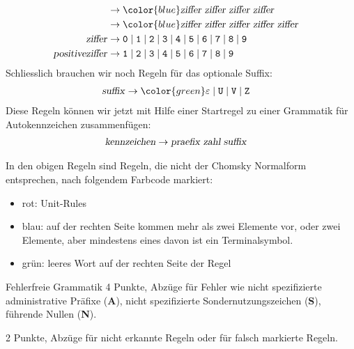 \begin{loesung}
\begin{teilaufgaben}
\begin{align*}
\\
&\rightarrow
{\color{blue}
\text{\textsl{ziffer}}\;
\text{\textsl{ziffer}}\;
\text{\textsl{ziffer}}\;
\text{\textsl{ziffer}}}
\\
&\rightarrow
{\color{blue}
\text{\textsl{ziffer}}\;
\text{\textsl{ziffer}}\;
\text{\textsl{ziffer}}\;
\text{\textsl{ziffer}}\;
\text{\textsl{ziffer}}}
\\
\text{\textsl{ziffer}}
&\rightarrow
{\tt 0}\;|\;
{\tt 1}\;|\;
{\tt 2}\;|\;
{\tt 3}\;|\;
{\tt 4}\;|\;
{\tt 5}\;|\;
{\tt 6}\;|\;
{\tt 7}\;|\;
{\tt 8}\;|\;
{\tt 9}
\\
\text{\textsl{positiveziffer}}
&\rightarrow
{\tt 1}\;|\;
{\tt 2}\;|\;
{\tt 3}\;|\;
{\tt 4}\;|\;
{\tt 5}\;|\;
{\tt 6}\;|\;
{\tt 7}\;|\;
{\tt 8}\;|\;
{\tt 9}
\\
\end{align*}
Schliesslich brauchen wir noch Regeln für das optionale Suffix:
\begin{align*}
\text{\textsl{suffix}}
&\rightarrow{\color{green}\varepsilon} \;|\;
{\tt U} \;|\;
{\tt V} \;|\;
{\tt Z}
\end{align*}
Diese Regeln können wir jetzt mit Hilfe einer Startregel zu einer
Grammatik für Autokennzeichen zusammenfügen:
\begin{align*}
\text{\textsl{kennzeichen}}&\rightarrow
\text{\textsl{praefix}}\;\text{\textsl{zahl}}\;\text{\textsl{suffix}}
\end{align*}
\item In den obigen Regeln sind Regeln, die nicht der Chomsky Normalform
entsprechen, nach folgendem Farbcode markiert:
\begin{itemize}
\item {\color{red} rot}: Unit-Rules
\item {\color{blue} blau}: auf der rechten Seite kommen mehr als
zwei Elemente vor, oder zwei Elemente, aber mindestens eines davon
ist ein Terminalsymbol.
\item {\color{green} grün}: leeres Wort auf der rechten Seite der Regel
\qedhere
\end{itemize}
\end{teilaufgaben}
\end{loesung}

\begin{bewertung}
\begin{teilaufgaben}
\item Fehlerfreie Grammatik 4 Punkte, Abzüge für Fehler wie
nicht spezifizierte administrative Präfixe ({\bf A}), nicht spezifizierte
Sondernutzungszeichen ({\bf S}), führende Nullen ({\bf N}).
\item 2 Punkte, Abzüge für nicht erkannte Regeln oder für falsch
markierte Regeln.
\end{teilaufgaben}
\end{bewertung}

